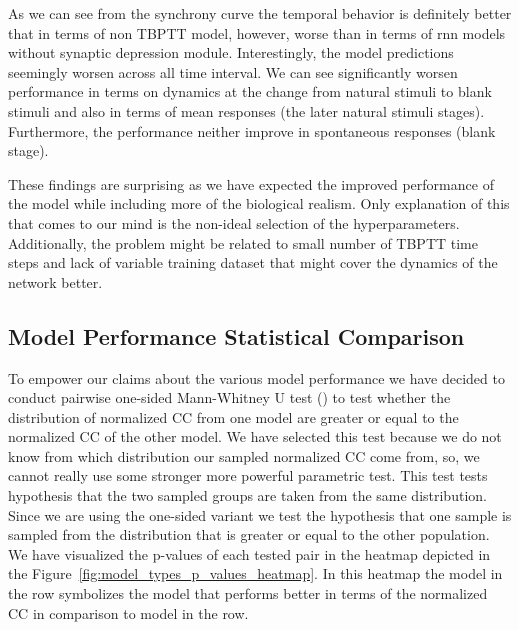 As we can see from the synchrony curve the temporal behavior is definitely better that in terms of non TBPTT model, however, worse than in terms of rnn models without synaptic depression module. Interestingly, the model predictions seemingly worsen across all time interval. We can see significantly worsen performance in terms on dynamics at the change from natural stimuli to blank stimuli and also in terms of mean responses (the later natural stimuli stages). Furthermore, the performance neither improve in spontaneous responses (blank stage). 

These findings are surprising as we have expected the improved performance of the model while including more of the biological realism. Only explanation of this that comes to our mind is the non-ideal selection of the hyperparameters. Additionally, the problem might be related to small number of TBPTT time steps and lack of variable training dataset that might cover the dynamics of the network better.

\subsection{Model Performance Statistical Comparison}
\label{subsec:model_performance_statistical_comparison}

To empower our claims about the various model performance we have decided to conduct pairwise one-sided Mann-Whitney U test (\citet{mann_whithey_1947}) to test whether the distribution of normalized CC from one model are greater or equal to the normalized CC of the other model. We have selected this test because we do not know from which distribution our sampled normalized CC come from, so, we cannot really use some stronger more powerful parametric test. This test tests hypothesis that the two sampled groups are taken from the same distribution. Since we are using the one-sided variant we test the hypothesis that one sample is sampled from the distribution that is greater or equal to the other population. We have visualized the p-values of each tested pair in the heatmap depicted in the Figure~\ref{fig:model_types_p_values_heatmap}. In this heatmap the model in the row symbolizes the model that performs better in terms of the normalized CC in comparison to model in the row.

